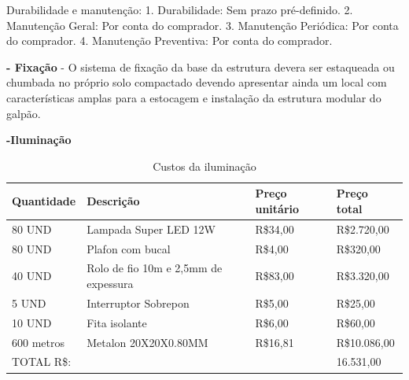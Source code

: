Durabilidade e manutenção:
1. Durabilidade: Sem prazo pré-definido.
2. Manutenção Geral: Por conta do comprador.
3. Manutenção Periódica: Por conta do comprador.
4. Manutenção Preventiva: Por conta do comprador.

\textbf{- Fixação} - O sistema de fixação da base da estrutura devera ser estaqueada ou chumbada no próprio solo compactado devendo apresentar ainda um local com características amplas para a estocagem e instalação da estrutura modular do galpão.

\textbf{-Iluminação}

\begin{table}[h]
\centering
\caption{Custos da iluminação}
\label{CustosIluminacao}
\begin{tabular}{|l|l|l|l|}
\hline
Quantidade & Descrição                            & Preço unitário & Preço total  \\ \hline
80 UND     & Lampada Super LED 12W                & R\$34,00       & R\$2.720,00  \\ \hline
80 UND     & Plafon com bucal                     & R\$4,00        & R\$320,00    \\ \hline
40 UND     & Rolo de fio 10m e 2,5mm de expessura & R\$83,00       & R\$3.320,00  \\ \hline
5 UND      & Interruptor Sobrepon                 & R\$5,00        & R\$25,00     \\ \hline
10 UND     & Fita isolante                        & R\$6,00        & R\$60,00     \\ \hline
600 metros & Metalon 20X20X0.80MM                 & R\$16,81       & R\$10.086,00 \\ \hline
TOTAL R\$: &                                      &                & 16.531,00    \\ \hline
\end{tabular}
\end{table}

